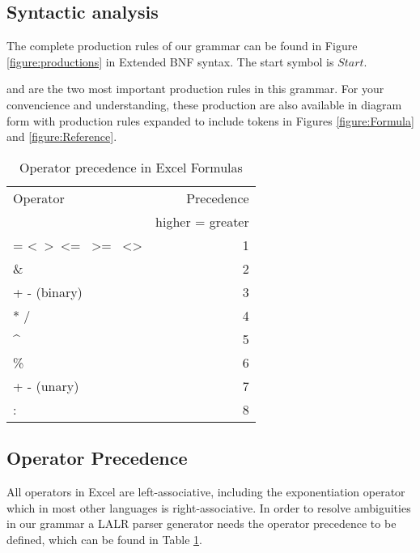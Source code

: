 \documentclass[conference]{IEEEtran}
\begin{document}
\subsection{Syntactic analysis}
\label{subsection:productionRules}

The complete production rules of our grammar can be found in Figure \ref{figure:productions} in Extended BNF syntax.
The start symbol is $Start$.

 and  are the two most important production rules in this grammar.
For your convencience and understanding, these production are also available in diagram form with production rules expanded to include tokens in Figures \ref{figure:Formula} and \ref{figure:Reference}.

\begin{table}
\caption{Operator precedence in Excel Formulas}
\label{table:operatorprec}
\begin{tabular}{lr}
Operator                                                                & Precedence \\
 & higher = greater \\
= \textless \  \textgreater \  \textless= \  \textgreater= \  \textless\textgreater & 1          \\
\&                                                                      & 2          \\
+ - (binary)                                                            & 3          \\
* /                                                                     & 4          \\
\textasciicircum                                                        & 5          \\
\%                                                                      & 6          \\
+ - (unary)                                                             & 7          \\
: \texttt{\char32}                                                             & 8         
\end{tabular}
\end{table}

\subsection{Operator Precedence}

All operators in Excel are left-associative, including the exponentiation operator which in most other languages is right-associative.
In order to resolve ambiguities in our grammar a LALR parser generator needs the operator precedence to be defined, which can be found in Table \ref{table:operatorprec}.
\end{document}
